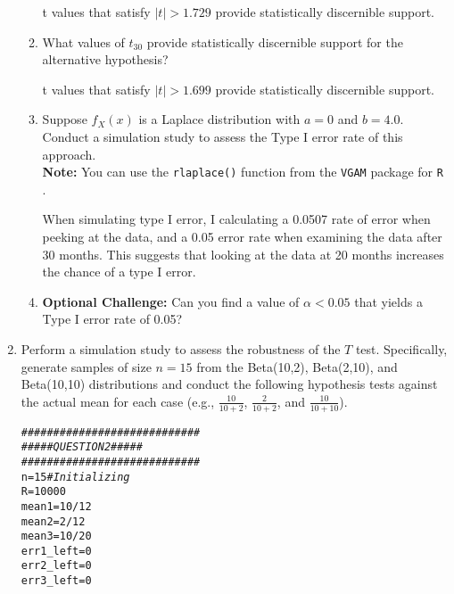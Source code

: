 \documentclass{article}\usepackage[]{graphicx}\usepackage[]{xcolor}
\makeatletter
\newcommand{\hlnum}[1]{\textcolor[rgb]{0.686,0.059,0.569}{#1}}%
\newcommand{\hlcom}[1]{\textcolor[rgb]{0.678,0.584,0.686}{\textit{#1}}}%
\newcommand{\hlopt}[1]{\textcolor[rgb]{0,0,0}{#1}}%
\newcommand{\hldef}[1]{\textcolor[rgb]{0.345,0.345,0.345}{#1}}%
\newcommand{\hlkwb}[1]{\textcolor[rgb]{0.69,0.353,0.396}{#1}}%
\newenvironment{kframe}{%
 \def\at@end@of@kframe{}%
 \ifinner\ifhmode%
  \def\at@end@of@kframe{\end{minipage}}%
  \begin{minipage}{\columnwidth}%
 \fi\fi%
 \def\FrameCommand##1{\hskip\@totalleftmargin \hskip-\fboxsep
 \colorbox{shadecolor}{##1}\hskip-\fboxsep
     \hskip-\linewidth \hskip-\@totalleftmargin \hskip\columnwidth}%
 \MakeFramed {\advance\hsize-\width
   \@totalleftmargin\z@ \linewidth\hsize
   \@setminipage}}%
 {\par\unskip\endMakeFramed%
 \at@end@of@kframe}
\newenvironment{knitrout}{}{} %
\makeatother
\begin{document}
\begin{enumerate}
\begin{enumerate}
t values that satisfy $\left|{t}\right|>1.729$ provide statistically discernible support.

  \item What values of $t_{30}$ provide statistically discernible support for the
  alternative hypothesis?
  
  t values that satisfy $\left|{t}\right|>1.699$ provide statistically discernible support.
  
  \item Suppose $f_X(x)$ is a Laplace distribution with $a=0$ and $b=4.0$.
  Conduct a simulation study to assess the Type I error rate of this approach.\\
  \textbf{Note:} You can use the \texttt{rlaplace()} function from the \texttt{VGAM}
  package for \texttt{R} \citep{VGAM}.
  
  When simulating type I error, I calculating a 0.0507 rate of error when peeking at the data, and a 0.05 error rate when examining the data after 30 months. This suggests that looking at the data at 20 months increases the chance of a type I error.
  
  \item \textbf{Optional Challenge:} Can you find a value of $\alpha<0.05$ that yields a 
  Type I error rate of 0.05?
\end{enumerate}
  \item Perform a simulation study to assess the robustness of the $T$ test. 
  Specifically, generate samples of size $n=15$ from the Beta(10,2), Beta(2,10), 
  and Beta(10,10) distributions and conduct the following hypothesis tests against 
  the actual mean for each case (e.g., $\frac{10}{10+2}$, $\frac{2}{10+2}$, and 
  $\frac{10}{10+10}$).
  
\begin{knitrout}\scriptsize
{}\color{fgcolor}\begin{kframe}
\begin{alltt}
\hlcom{############################}
\hlcom{#####    QUESTION 2    #####}
\hlcom{############################}
\hldef{n}\hlkwb{=}\hlnum{15} \hlcom{#Initializing}
\hldef{R}\hlkwb{=}\hlnum{10000}
\hldef{mean1} \hlkwb{=} \hlnum{10}\hlopt{/}\hlnum{12}
\hldef{mean2} \hlkwb{=} \hlnum{2}\hlopt{/}\hlnum{12}
\hldef{mean3} \hlkwb{=} \hlnum{10}\hlopt{/}\hlnum{20}
\hldef{err1_left}\hlkwb{=}\hlnum{0}
\hldef{err2_left}\hlkwb{=}\hlnum{0}
\hldef{err3_left}\hlkwb{=}\hlnum{0}


\end{alltt}
\end{kframe}
\end{knitrout}
\end{enumerate}
\end{document}
